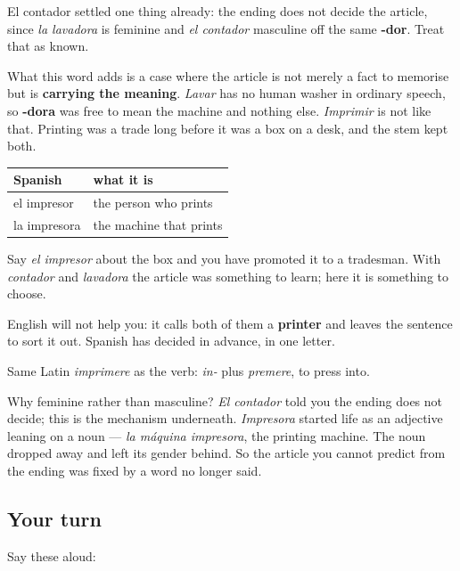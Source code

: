 \begin{grammarlens}[title={Grammar Lens: the article says which one you mean}]
El contador settled one thing already: the ending does not decide the article, since \emph{la lavadora} is feminine and \emph{el contador} masculine off the same \textbf{-dor}. Treat that as known.

What this word adds is a case where the article is not merely a fact to memorise but is \textbf{carrying the meaning}. \emph{Lavar} has no human washer in ordinary speech, so \textbf{-dora} was free to mean the machine and nothing else. \emph{Imprimir} is not like that. Printing was a trade long before it was a box on a desk, and the stem kept both.

\noindent
\begin{tabularx}{\linewidth}{@{}>{\raggedright\arraybackslash}X>{\raggedright\arraybackslash}X@{}}
\toprule
\textbf{Spanish} & \textbf{what it is} \\
\midrule
el impresor & the person who prints \\
la impresora & the machine that prints \\
\bottomrule
\end{tabularx}

Say \emph{el impresor} about the box and you have promoted it to a tradesman. With \emph{contador} and \emph{lavadora} the article was something to learn; here it is something to choose.

English will not help you: it calls both of them a \textbf{printer} and leaves the sentence to sort it out. Spanish has decided in advance, in one letter.
\end{grammarlens}

\begin{cousinweb}
Same Latin \emph{imprimere} as the verb: \emph{in-} plus \emph{premere}, to press into.

Why feminine rather than masculine? \emph{El contador} told you the ending does not decide; this is the mechanism underneath. \emph{Impresora} started life as an adjective leaning on a noun — \emph{la máquina impresora}, the printing machine. The noun dropped away and left its gender behind. So the article you cannot predict from the ending was fixed by a word no longer said.
\end{cousinweb}

\subsection*{Your turn}
Say these aloud:

